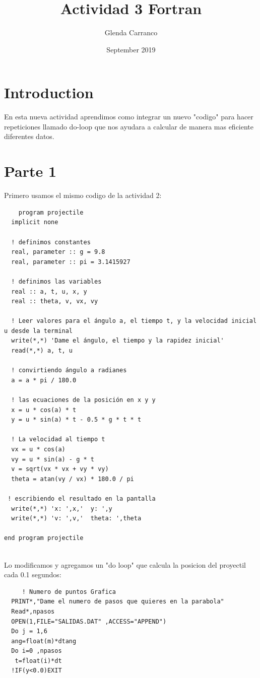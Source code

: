 \documentclass{article}
\title{Actividad 3 Fortran}
\author{Glenda Carranco}
\date{September 2019}
\begin{document}
\maketitle

\section{Introduction}
En esta nueva actividad aprendimos como integrar un nuevo "codigo" para hacer repeticiones llamado do-loop que nos ayudara a calcular de manera mas eficiente diferentes datos.

\section{Parte 1}
Primero usamos el mismo codigo de la actividad 2:
\begin{verbatim}
    program projectile
  implicit none

  ! definimos constantes
  real, parameter :: g = 9.8
  real, parameter :: pi = 3.1415927

  ! definimos las variables
  real :: a, t, u, x, y
  real :: theta, v, vx, vy

  ! Leer valores para el ángulo a, el tiempo t, y la velocidad inicial u desde la terminal
  write(*,*) 'Dame el ángulo, el tiempo y la rapidez inicial'
  read(*,*) a, t, u

  ! convirtiendo ángulo a radianes
  a = a * pi / 180.0
  
  ! las ecuaciones de la posición en x y y
  x = u * cos(a) * t
  y = u * sin(a) * t - 0.5 * g * t * t

  ! La velocidad al tiempo t
  vx = u * cos(a)
  vy = u * sin(a) - g * t
  v = sqrt(vx * vx + vy * vy)
  theta = atan(vy / vx) * 180.0 / pi
 
 ! escribiendo el resultado en la pantalla
  write(*,*) 'x: ',x,'  y: ',y
  write(*,*) 'v: ',v,'  theta: ',theta

end program projectile
 
\end{verbatim}

Lo modificamos y agregamos un "do loop" que calcula la posicion del proyectil cada 0.1 segundos:
\begin{verbatim}
     ! Numero de puntos Grafica
  PRINT*,"Dame el numero de pasos que quieres en la parabola"
  Read*,npasos
  OPEN(1,FILE="SALIDAS.DAT" ,ACCESS="APPEND")
  Do j = 1,6
  ang=float(m)*dtang
  Do i=0 ,npasos
   t=float(i)*dt
  !IF(y<0.0)EXIT
  
\end{verbatim}
\end{document}
